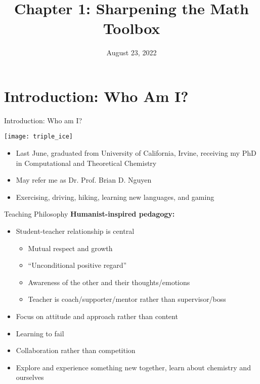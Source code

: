 \documentclass[11pt]{beamer}
\title{Chapter 1: Sharpening the Math Toolbox}
\institute{Chemistry Department, Cypress College}
\date{August 23, 2022}
\begin{document}
\begin{frame}
  \titlepage
\end{frame}

\section{Introduction: Who Am I?}

\begin{frame}{Introduction: Who am I?}
  \begin{center}
    \texttt{[image: triple\_ice]}
  \end{center}
  \begin{itemize}
  \item Last June, graduated from University of California, Irvine,
    receiving my PhD in Computational and Theoretical Chemistry
  \item May refer me as Dr. Prof. Brian D. Nguyen
  \item Exercising, driving, hiking, learning new languages, and gaming
  \end{itemize}
\end{frame}

\begin{frame}{Teaching Philosophy}
  \textbf{Humanist-inspired pedagogy:}
  \begin{itemize}
  \item Student-teacher relationship is central
    \begin{itemize}
    \item Mutual respect and growth
    \item ``Unconditional positive regard''
    \item Awareness of the other and their thoughts/emotions
    \item Teacher is coach/supporter/mentor rather than supervisor/boss
    \end{itemize}
  \item Focus on attitude and approach rather than content
  \item Learning to fail
  \item Collaboration rather than competition
  \item Explore and experience something new together, learn about
    chemistry and ourselves
  \end{itemize}
\end{frame}
\end{document}
